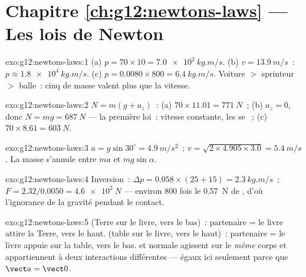 \section*{Chapitre \ref{ch:g12:newtons-laws} --- Les lois de Newton}

\begin{solution}{exo:g12:newtons-laws:1}
(a) $p = 70 \times 10 = \qty{7.0e2}{kg.m/s}$.
(b) $v = \qty{13.9}{m/s}$~: $p \approx \qty{1.8e4}{kg.m/s}$.
(c) $p = 0.0080 \times 800 = \qty{6.4}{kg.m/s}$. Voiture $>$ sprinteur $>$
balle~: cinq  de masse valent plus que la vitesse.
\end{solution}

\begin{solution}{exo:g12:newtons-laws:2}
$N = m(g + a_z)$~: (a) $70 \times 11.01 = \qty{771}{N}$~;
(b) $a_z = 0$, donc $N = mg = \qty{687}{N}$ --- la première loi~: vitesse
constante, les  se ~; (c) $70 \times 8.61 = \qty{603}{N}$.
\end{solution}

\begin{solution}{exo:g12:newtons-laws:3}
$a = g\sin 30^\circ = \qty{4.9}{m/s^2}$~;
$v = \sqrt{2 \times 4.905 \times 3.0} = \qty{5.4}{m/s}$. La masse
s'annule entre $ma$ et $mg\sin\alpha$.
\end{solution}

\begin{solution}{exo:g12:newtons-laws:4}
Inversion~: $\Delta p = 0.058 \times (25 + 15) = \qty{2.3}{kg.m/s}$~;
$F = 2.32/0.0050 = \qty{4.6e2}{N}$ --- environ $800$ fois le
\qty{0.57}{N} de , d'où l'ignorance de la gravité pendant le contact.
\end{solution}

\begin{solution}{exo:g12:newtons-laws:5}
 (Terre sur le livre, vers le bas)~: partenaire = le livre attire
la Terre, vers le haut.  (table sur le livre, vers le
haut)~: partenaire = le livre appuie sur la table, vers le bas.
 et normale agissent sur le \emph{même} corps et appartiennent
à deux interactions différentes --- égaux ici seulement parce que
$\vect a = \vect 0$.
\end{solution}

